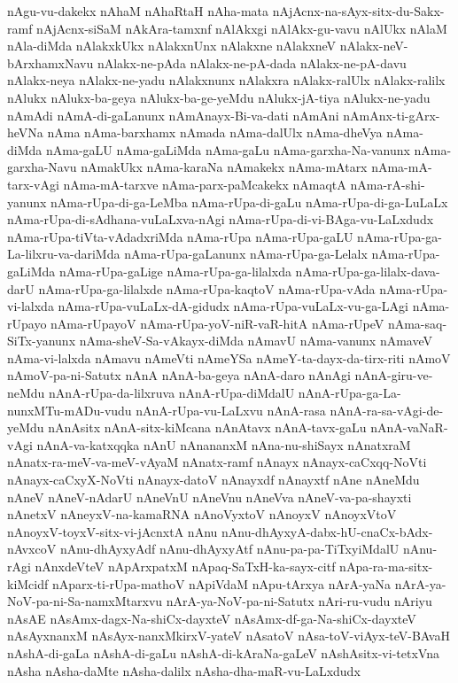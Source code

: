 {nAgu-vu-dakekx
nAhaM
nAhaRtaH
nAha-mata
nAjAcnx-na-sAyx-sitx-du-Sakx-ramf
nAjAcnx-siSaM
nAkAra-tamxnf
nAlAkxgi
nAlAkx-gu-vavu
nAlUkx
nAlaM
nAla-diMda
nAlakxkUkx
nAlakxnUnx
nAlakxne
nAlakxneV
nAlakx-neV-bArxhamxNavu
nAlakx-ne-pAda
nAlakx-ne-pA-dada
nAlakx-ne-pA-davu
nAlakx-neya
nAlakx-ne-yadu
nAlakxnunx
nAlakxra
nAlakx-ralUlx
nAlakx-ralilx
nAlukx
nAlukx-ba-geya
nAlukx-ba-ge-yeMdu
nAlukx-jA-tiya
nAlukx-ne-yadu
nAmAdi
nAmA-di-gaLanunx
nAmAnayx-Bi-va-dati
nAmAni
nAmAnx-ti-gArx-heVNa
nAma
nAma-barxhamx
nAmada
nAma-dalUlx
nAma-dheVya
nAma-diMda
nAma-gaLU
nAma-gaLiMda
nAma-gaLu
nAma-garxha-Na-vanunx
nAma-garxha-Navu
nAmakUkx
nAma-karaNa
nAmakekx
nAma-mAtarx
nAma-mA-tarx-vAgi
nAma-mA-tarxve
nAma-parx-paMcakekx
nAmaqtA
nAma-rA-shi-yanunx
nAma-rUpa-di-ga-LeMba
nAma-rUpa-di-gaLu
nAma-rUpa-di-ga-LuLaLx
nAma-rUpa-di-sAdhana-vuLaLxva-nAgi
nAma-rUpa-di-vi-BAga-vu-LaLxdudx
nAma-rUpa-tiVta-vAdadxriMda
nAma-rUpa
nAma-rUpa-gaLU
nAma-rUpa-ga-La-lilxru-va-dariMda
nAma-rUpa-gaLanunx
nAma-rUpa-ga-Lelalx
nAma-rUpa-gaLiMda
nAma-rUpa-gaLige
nAma-rUpa-ga-lilalxda
nAma-rUpa-ga-lilalx-dava-darU
nAma-rUpa-ga-lilalxde
nAma-rUpa-kaqtoV
nAma-rUpa-vAda
nAma-rUpa-vi-lalxda
nAma-rUpa-vuLaLx-dA-gidudx
nAma-rUpa-vuLaLx-vu-ga-LAgi
nAma-rUpayo
nAma-rUpayoV
nAma-rUpa-yoV-niR-vaR-hitA
nAma-rUpeV
nAma-saq-SiTx-yanunx
nAma-sheV-Sa-vAkayx-diMda
nAmavU
nAma-vanunx
nAmaveV
nAma-vi-lalxda
nAmavu
nAmeVti
nAmeYSa
nAmeY-ta-dayx-da-tirx-riti
nAmoV
nAmoV-pa-ni-Satutx
nAnA
nAnA-ba-geya
nAnA-daro
nAnAgi
nAnA-giru-ve-neMdu
nAnA-rUpa-da-lilxruva
nAnA-rUpa-diMdalU
nAnA-rUpa-ga-La-nunxMTu-mADu-vudu
nAnA-rUpa-vu-LaLxvu
nAnA-rasa
nAnA-ra-sa-vAgi-de-yeMdu
nAnAsitx
nAnA-sitx-kiMcana
nAnAtavx
nAnA-tavx-gaLu
nAnA-vaNaR-vAgi
nAnA-va-katxqqka
nAnU
nAnananxM
nAna-nu-shiSayx
nAnatxraM
nAnatx-ra-meV-va-meV-vAyaM
nAnatx-ramf
nAnayx
nAnayx-caCxqq-NoVti
nAnayx-caCxyX-NoVti
nAnayx-datoV
nAnayxdf
nAnayxtf
nAne
nAneMdu
nAneV
nAneV-nAdarU
nAneVnU
nAneVnu
nAneVva
nAneV-va-pa-shayxti
nAnetxV
nAneyxV-na-kamaRNA
nAnoVyxtoV
nAnoyxV
nAnoyxVtoV
nAnoyxV-toyxV-sitx-vi-jAcnxtA
nAnu
nAnu-dhAyxyA-dabx-hU-cnaCx-bAdx-nAvxcoV
nAnu-dhAyxyAdf
nAnu-dhAyxyAtf
nAnu-pa-pa-TiTxyiMdalU
nAnu-rAgi
nAnxdeVteV
nApArxpatxM
nApaq-SaTxH-ka-sayx-citf
nApa-ra-ma-sitx-kiMcidf
nAparx-ti-rUpa-mathoV
nApiVdaM
nApu-tArxya
nArA-yaNa
nArA-ya-NoV-pa-ni-Sa-namxMtarxvu
nArA-ya-NoV-pa-ni-Satutx
nAri-ru-vudu
nAriyu
nAsAE
nAsAmx-dagx-Na-shiCx-dayxteV
nAsAmx-df-ga-Na-shiCx-dayxteV
nAsAyxnanxM
nAsAyx-nanxMkirxV-yateV
nAsatoV
nAsa-toV-viAyx-teV-BAvaH
nAshA-di-gaLa
nAshA-di-gaLu
nAshA-di-kAraNa-gaLeV
nAshAsitx-vi-tetxVna
nAsha
nAsha-daMte
nAsha-dalilx
nAsha-dha-maR-vu-LaLxdudx
}
